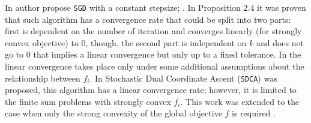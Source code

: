 In  author propose \texttt{SGD} with a constant stepsize; . In Proposition $2.4$ \cite{nedic2001convergence} it was proven that such algorithm has a convergence rate that could be split into two parts: first is dependent on the number of iteration and converges linearly (for strongly convex objective) to $0$, though, the second part is independent on $k$ and does not go to $0$ that implies a linear convergence but only up to a fixed tolerance. In \cite{solodov1998incremental} the linear convergence takes place only under some additional assumptions about the relationship between $f_i$. In \cite{shalev2013stochastic} Stochastic Dual Coordinate Ascent (\texttt{SDCA}) was proposed, this algorithm has a linear convergence rate; however, it is limited to the finite sum problems with strongly convex $f_i$. This work was extended to the case when only the strong convexity of the global objective $f$ is required \cite{shalev2016sdca}.

